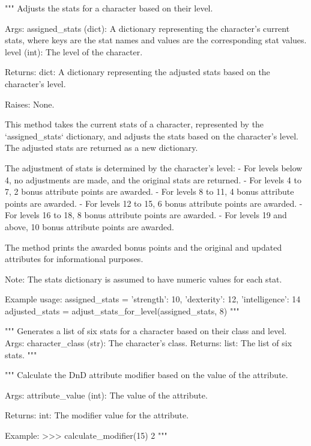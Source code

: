 \begin{codebox}
"""
Adjusts the stats for a character based on their level.

Args:
    assigned_stats (dict): A dictionary representing the character's current stats, where keys are
        the stat names and values are the corresponding stat values.
    level (int): The level of the character.

Returns:
    dict: A dictionary representing the adjusted stats based on the character's level.

Raises:
    None.

This method takes the current stats of a character, represented by the `assigned_stats` dictionary,
and adjusts the stats based on the character's level. The adjusted stats are returned as a new dictionary.

The adjustment of stats is determined by the character's level:
 - For levels below 4, no adjustments are made, and the original stats are returned.
 - For levels 4 to 7, 2 bonus attribute points are awarded.
 - For levels 8 to 11, 4 bonus attribute points are awarded.
 - For levels 12 to 15, 6 bonus attribute points are awarded.
 - For levels 16 to 18, 8 bonus attribute points are awarded.
 - For levels 19 and above, 10 bonus attribute points are awarded.

The method prints the awarded bonus points and the original and updated attributes for informational purposes.

Note: The stats dictionary is assumed to have numeric values for each stat.

Example usage:
    assigned_stats = {'strength': 10, 'dexterity': 12, 'intelligence': 14}
    adjusted_stats = adjust_stats_for_level(assigned_stats, 8)
"""
\end{codebox}

\begin{codebox}[generate\_character\_stats(character\_class, level=1)]
"""
Generates a list of six stats for a character based on their class and level.
Args:
    character_class (str): The character's class.
Returns:
    list: The list of six stats.
"""
\end{codebox}

\begin{codebox}
"""
Calculate the DnD attribute modifier based on the value of the attribute.

Args:
    attribute_value (int): The value of the attribute.

Returns:
    int: The modifier value for the attribute.

Example:
    >>> calculate_modifier(15)
    2
"""
\end{codebox}

